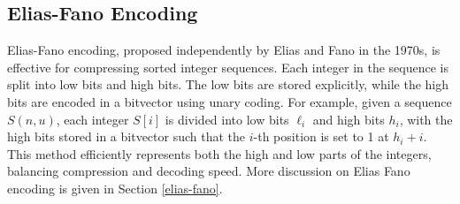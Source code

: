 \subsection{Elias-Fano Encoding}
Elias-Fano encoding, proposed independently by Elias\cite{Elias_1974} and Fano\cite{Fano_1971} in the 1970s, is effective for compressing sorted integer sequences. Each integer in the sequence is split into low bits and high bits. The low bits are stored explicitly, while the high bits are encoded in a bitvector using unary coding. For example, given a sequence \( S(n, u) \), each integer \( S[i] \) is divided into low bits \(\ell_i\) and high bits \( h_i \), with the high bits stored in a bitvector such that the \( i \)-th position is set to 1 at \( h_i + i \). This method efficiently represents both the high and low parts of the integers, balancing compression and decoding speed. More discussion on Elias Fano encoding is given in Section \ref{elias-fano}.
